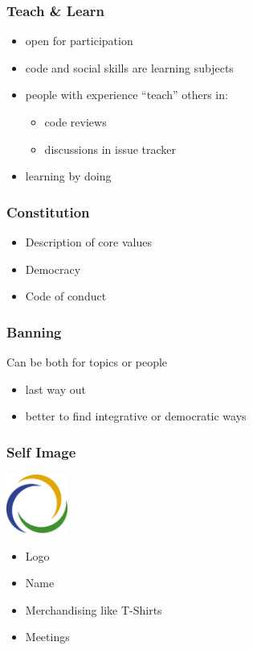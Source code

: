 \begin{frame}
	\frametitle{Teach \& Learn}

	\begin{itemize}[<+-| alert@+>]
		\item open for participation
		\item code and social skills are learning subjects
		\item people with experience ``teach'' others in:
		\begin{itemize}[<+-| alert@+>]
			\item code reviews
			\item discussions in issue tracker
		\end{itemize}
		\item learning by doing
	\end{itemize}
\end{frame}

\begin{frame}
	\frametitle{Constitution}
	\begin{itemize}
		\item Description of core values
		\item Democracy
		\item Code of conduct
	\end{itemize}
\end{frame}

\begin{frame}
	\frametitle{Banning}

	Can be both for topics or people

	\begin{itemize}
		\item last way out
		\item better to find integrative or democratic ways
	\end{itemize}
\end{frame}


\begin{frame}
	\frametitle{Self Image}

	\hfill \includegraphics[width=2cm]{../figures/logo}
	\begin{itemize}[<+-| alert@+>]
		\item Logo
		\item Name
		\item Merchandising like T-Shirts
		\item Meetings
	\end{itemize}
\end{frame}

